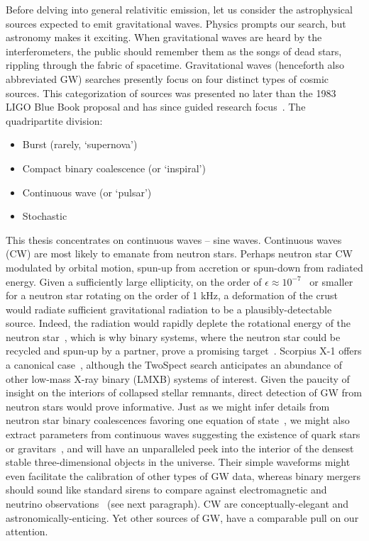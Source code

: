 Before delving into general relativitic emission, let us consider the astrophysical sources expected to emit gravitational waves. 
Physics prompts our search, but astronomy makes it exciting.
When gravitational waves are heard by the interferometers, the public should remember them as the songs of dead stars, rippling through the fabric of spacetime.  
Gravitational waves (henceforth also abbreviated GW) searches presently focus on four distinct types of cosmic sources.
This categorization of sources was presented no later than the 1983 LIGO Blue Book proposal and has since guided research focus~\cite{CollinsGravityShadow,Schutz1989}. 
The quadripartite division:
\begin{itemize}
\item Burst (rarely, `supernova')
\item Compact binary coalescence (or `inspiral')
\item Continuous wave (or `pulsar')
\item Stochastic
\end{itemize}

This thesis concentrates on continuous waves -- sine waves. 
Continuous waves (CW) are most likely to emanate from neutron stars. 
Perhaps neutron star CW modulated by orbital motion, spun-up from accretion or spun-down from radiated energy. 
Given a sufficiently large ellipticity, on the order of $\epsilon \approx 10^{-7}$~\cite{Owen2005} or smaller for a neutron star rotating on the order of 1 kHz, a deformation of the crust would radiate sufficient gravitational radiation to be a plausibly-detectable source. 
Indeed, the radiation would rapidly deplete the rotational energy of the neutron star~\cite{Owen1998}, which is why binary systems, where the neutron star could be recycled and spun-up by a partner, prove a promising target~\cite{PapaloizouPringle1978,Wagoner1984}. 
Scorpius X-1 offers a canonical case~\cite{AbbottScoX12007}, although the TwoSpect search anticipates an abundance of other low-mass X-ray binary (LMXB) systems of interest. 
Given the paucity of insight on the interiors of collapsed stellar remnants, direct detection of GW from neutron stars would prove informative. 
Just as we might infer details from neutron star binary coalescences favoring one equation of state~\cite{Lattimer2007,Read2009}, we might also extract parameters from continuous waves suggesting the existence of quark stars or gravitars~\cite{Owen2005}, and will have an unparalleled peek into the interior of the densest stable three-dimensional objects in the universe. 
Their simple waveforms might even facilitate the calibration of other types of GW data, whereas binary mergers should sound like standard sirens to compare against electromagnetic and neutrino observations~\cite{Punturo2010}
(see next paragraph).
CW are conceptually-elegant and astronomically-enticing.
Yet other sources of GW, have a comparable pull on our attention. 

